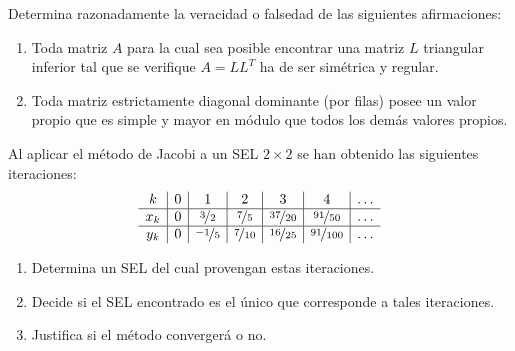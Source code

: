 \documentclass[12pt]{article}
\begin{document}
	\begin{ejercicio}
		Determina razonadamente la veracidad o falsedad de las siguientes afirmaciones:
		\begin{enumerate}[label=\alph*)]
			\item Toda matriz $A$ para la cual sea posible encontrar una matriz $L$ triangular inferior tal que se verifique $A = LL^T$ ha de ser simétrica y regular.
			
			\item Toda matriz estrictamente diagonal dominante (por filas) posee un valor propio que es simple y 
			mayor en módulo que todos los demás valores propios.
		\end{enumerate}
	\end{ejercicio}
	
	\begin{ejercicio}
		Al aplicar el método de Jacobi a un SEL $2 \times 2$ se han obtenido las siguientes iteraciones:
		$$ \begin{array}{c|c|c|c|c|c|c}
			k & 0 & 1 & 2 & 3 & 4 & \ldots \\
			\hline
			x_k & 0 & \nicefrac{3}{2} & \nicefrac{7}{5} & \nicefrac{37}{20} & \nicefrac{91}{50} & \ldots \\
			\hline
			y_k & 0 & \nicefrac{-1}{5} & \nicefrac{7}{10} & \nicefrac{16}{25} & \nicefrac{91}{100} & \ldots 
		\end{array}$$
		
		\begin{enumerate}[label=\alph*)]
			\item Determina un SEL del cual provengan estas iteraciones.
			
			\item Decide si el SEL encontrado es el único que corresponde a tales iteraciones.
			
			\item Justifica si el método convergerá o no.
		\end{enumerate}
	\end{ejercicio}
	
\end{document}
